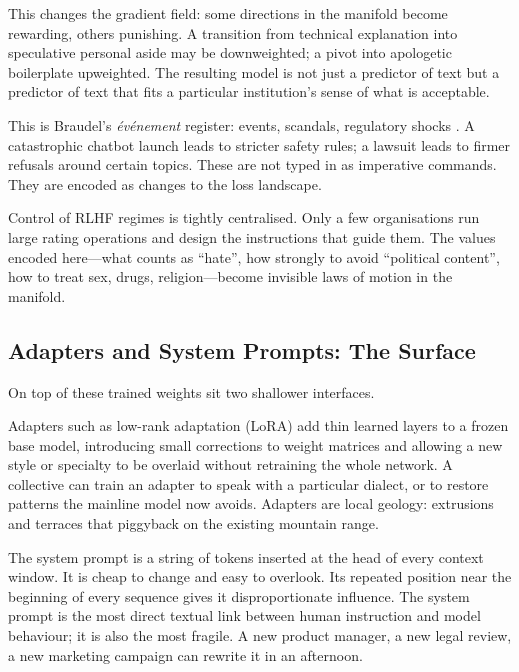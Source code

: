 \documentclass[12pt,a4paper]{article}
\begin{document}
This changes the gradient field: some directions in the manifold become rewarding, others punishing. A transition from technical explanation into speculative personal aside may be downweighted; a pivot into apologetic boilerplate upweighted. The resulting model is not just a predictor of text but a predictor of text that fits a particular institution's sense of what is acceptable.

This is Braudel's \emph{\'{e}v\'{e}nement} register: events, scandals, regulatory shocks \cite{braudel1980}. A catastrophic chatbot launch leads to stricter safety rules; a lawsuit leads to firmer refusals around certain topics. These are not typed in as imperative commands. They are encoded as changes to the loss landscape.

Control of RLHF regimes is tightly centralised. Only a few organisations run large rating operations and design the instructions that guide them. The values encoded here---what counts as ``hate'', how strongly to avoid ``political content'', how to treat sex, drugs, religion---become invisible laws of motion in the manifold.

\subsection{Adapters and System Prompts: The Surface}

On top of these trained weights sit two shallower interfaces.

Adapters such as low-rank adaptation (LoRA) add thin learned layers to a frozen base model, introducing small corrections to weight matrices and allowing a new style or specialty to be overlaid without retraining the whole network. A collective can train an adapter to speak with a particular dialect, or to restore patterns the mainline model now avoids. Adapters are local geology: extrusions and terraces that piggyback on the existing mountain range.

The system prompt is a string of tokens inserted at the head of every context window. It is cheap to change and easy to overlook. Its repeated position near the beginning of every sequence gives it disproportionate influence. The system prompt is the most direct textual link between human instruction and model behaviour; it is also the most fragile. A new product manager, a new legal review, a new marketing campaign can rewrite it in an afternoon.
\end{document}
